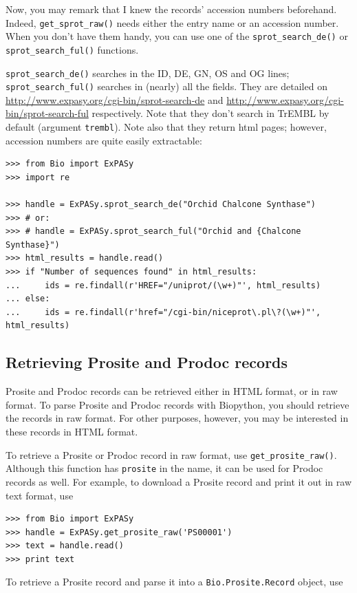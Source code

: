 \documentclass{report}
\begin{document}
Now, you may remark that I knew the records' accession numbers
beforehand. Indeed, \verb|get_sprot_raw()| needs either the entry name
or an accession number. When you don't have them handy, you can use
one of the \verb|sprot_search_de()| or \verb|sprot_search_ful()|
functions.

\verb|sprot_search_de()| searches in the ID, DE, GN, OS and OG lines;
\verb|sprot_search_ful()| searches in (nearly) all the fields. They
are detailed on
\url{http://www.expasy.org/cgi-bin/sprot-search-de} and
\url{http://www.expasy.org/cgi-bin/sprot-search-ful}
respectively. Note that they don't search in TrEMBL by default
(argument \verb|trembl|). Note also that they return html pages;
however, accession numbers are quite easily extractable:

\begin{verbatim}
>>> from Bio import ExPASy
>>> import re

>>> handle = ExPASy.sprot_search_de("Orchid Chalcone Synthase")
>>> # or:
>>> # handle = ExPASy.sprot_search_ful("Orchid and {Chalcone Synthase}")
>>> html_results = handle.read()
>>> if "Number of sequences found" in html_results:
...     ids = re.findall(r'HREF="/uniprot/(\w+)"', html_results)
... else:
...     ids = re.findall(r'href="/cgi-bin/niceprot\.pl\?(\w+)"', html_results)
\end{verbatim}

\subsection{Retrieving Prosite and Prodoc records}

Prosite and Prodoc records can be retrieved either in HTML format, or in raw format. To parse Prosite and Prodoc records with Biopython, you should retrieve the records in raw format. For other purposes, however, you may be interested in these records in HTML format.

To retrieve a Prosite or Prodoc record in raw format, use \verb|get_prosite_raw()|. Although this function has \verb|prosite| in the name, it can be used for Prodoc records as well. For example, to download a Prosite record and print it out in raw text format, use

\begin{verbatim}
>>> from Bio import ExPASy
>>> handle = ExPASy.get_prosite_raw('PS00001')
>>> text = handle.read()
>>> print text
\end{verbatim}

To retrieve a Prosite record and parse it into a \verb|Bio.Prosite.Record| object, use
\end{document}
